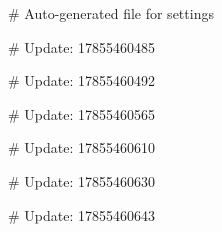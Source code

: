 # Auto-generated file for settings

# Update: 17855460485

# Update: 17855460492

# Update: 17855460565

# Update: 17855460610

# Update: 17855460630

# Update: 17855460643
